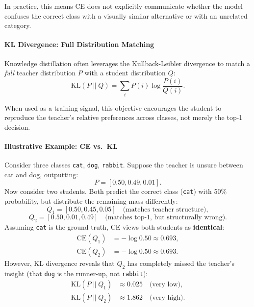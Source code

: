 \noindent
In practice, this means CE does not explicitly communicate whether the model confuses the correct class with a visually similar alternative or with an unrelated category.

\paragraph{KL Divergence: Full Distribution Matching}

\noindent
Knowledge distillation often leverages the Kullback-Leibler divergence to match a \emph{full} teacher distribution \(P\) with a student distribution \(Q\):
\begin{equation}
	\text{KL}(P \| Q) = \sum_i P(i) \log \frac{P(i)}{Q(i)}.
	\label{eq:chapter18_deit_kl}
\end{equation}

\noindent
When used as a training signal, this objective encourages the student to reproduce the teacher's relative preferences across classes, not merely the top-1 decision.

\paragraph{Illustrative Example: CE vs.\ KL}

\noindent
Consider three classes \texttt{cat}, \texttt{dog}, \texttt{rabbit}. Suppose the teacher is unsure between cat and dog, outputting:
\[
P = [0.50, 0.49, 0.01].
\]
Now consider two students. Both predict the correct class (\texttt{cat}) with 50\% probability, but distribute the remaining mass differently:
\[
Q_1 = [0.50, 0.45, 0.05] \quad \text{(matches teacher structure)},
\]
\[
Q_2 = [0.50, 0.01, 0.49] \quad \text{(matches top-1, but structurally wrong)}.
\]
Assuming \texttt{cat} is the ground truth, CE views both students as \textbf{identical}:
\begin{align*}
	\text{CE}(Q_1) &= -\log 0.50 \approx 0.693, \\
	\text{CE}(Q_2) &= -\log 0.50 \approx 0.693.
\end{align*}
However, KL divergence reveals that $Q_2$ has completely missed the teacher's insight (that \texttt{dog} is the runner-up, not \texttt{rabbit}):
\begin{align*}
	\text{KL}(P \| Q_1) &\approx 0.025 \quad \text{(very low)}, \\
	\text{KL}(P \| Q_2) &\approx 1.862 \quad \text{(very high)}.
\end{align*}

